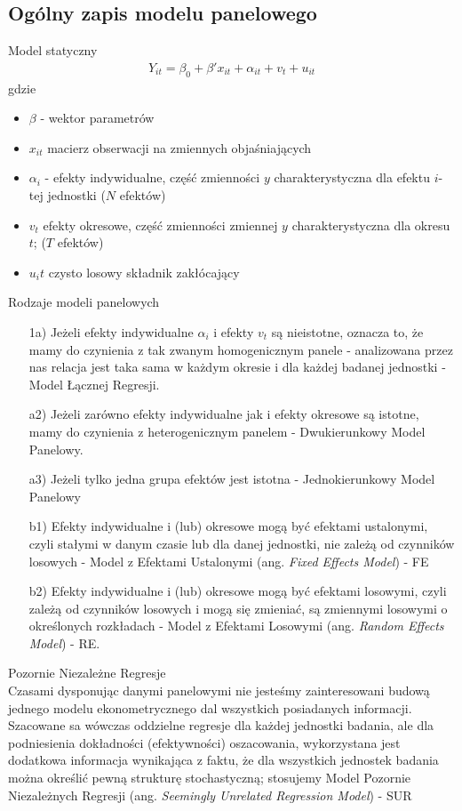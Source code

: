 \subsection{Ogólny zapis modelu panelowego}
Model statyczny
\begin{gather*}
Y_{it}=\beta_0+\beta'x_{it}+\alpha_{it}+v_t+u_{it}
\end{gather*}
gdzie
\begin{itemize}
\item $ \beta $ - wektor parametrów
\item $ x_{it} $ macierz obserwacji na zmiennych objaśniających
\item $ \alpha_i $ - efekty indywidualne, część zmienności $ y $ charakterystyczna dla efektu $ i $-tej jednostki ($ N $ efektów)
\item $ v_t $ efekty okresowe, część zmienności zmiennej $ y $ charakterystyczna dla okresu $ t $; ($ T $ efektów)
\item $ u_it $ czysto losowy składnik zakłócający
\end{itemize}
Rodzaje modeli panelowych
\begin{itemize}
\item[1a)] Jeżeli efekty indywidualne $ \alpha_i $ i efekty $ v_t $ są nieistotne, oznacza to, że mamy do czynienia z tak zwanym homogenicznym panele - analizowana przez nas relacja jest taka sama w każdym okresie i dla każdej badanej jednostki - Model Łącznej Regresji.
\item [a2)] Jeżeli zarówno efekty indywidualne jak i efekty okresowe są istotne, mamy do czynienia z heterogenicznym panelem - Dwukierunkowy Model Panelowy.
\item [a3)] Jeżeli tylko jedna grupa efektów jest istotna - Jednokierunkowy Model Panelowy
\item [b1)] Efekty indywidualne i (lub) okresowe mogą być efektami ustalonymi, czyli stałymi w danym czasie lub dla danej jednostki, nie zależą od czynników losowych - Model z Efektami Ustalonymi (ang. \textit{Fixed Effects Model}) - FE
\item [b2)] Efekty indywidualne i (lub) okresowe mogą być efektami losowymi, czyli zależą od czynników losowych i mogą się zmieniać, są zmiennymi losowymi o określonych rozkładach - Model z Efektami Losowymi (ang. \textit{Random Effects Model}) - RE.
\end{itemize}
Pozornie Niezależne Regresje\\
Czasami dysponując danymi panelowymi nie jesteśmy zainteresowani budową jednego modelu ekonometrycznego dal wszystkich posiadanych informacji. Szacowane sa wówczas oddzielne regresje dla każdej jednostki badania, ale dla podniesienia dokładności (efektywności) oszacowania, wykorzystana jest dodatkowa informacja wynikająca z faktu, że dla wszystkich jednostek badania można określić pewną strukturę stochastyczną; stosujemy Model Pozornie Niezależnych Regresji (ang. \textit{Seemingly Unrelated Regression Model}) - SUR
